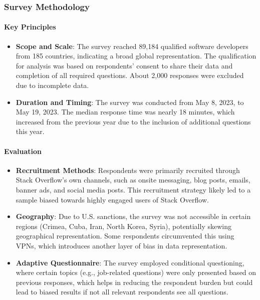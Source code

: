 \documentclass[
  12pt,
]{article}
\author{}
\date{\vspace{-2.5em}}
\begin{document}
\hypertarget{survey-methodology}{%
\subsubsection{Survey Methodology}\label{survey-methodology}}

\hypertarget{key-principles}{%
\paragraph{Key Principles}\label{key-principles}}

\begin{itemize}
\item
  \textbf{Scope and Scale}: The survey reached 89,184 qualified software
  developers from 185 countries, indicating a broad global
  representation. The qualification for analysis was based on
  respondents' consent to share their data and completion of all
  required questions. About 2,000 responses were excluded due to
  incomplete data.
\item
  \textbf{Duration and Timing}: The survey was conducted from May 8,
  2023, to May 19, 2023. The median response time was nearly 18 minutes,
  which increased from the previous year due to the inclusion of
  additional questions this year.
\end{itemize}

\hypertarget{evaluation}{%
\paragraph{Evaluation}\label{evaluation}}

\begin{itemize}
\item
  \textbf{Recruitment Methods}: Respondents were primarily recruited
  through Stack Overflow's own channels, such as onsite messaging, blog
  posts, emails, banner ads, and social media posts. This recruitment
  strategy likely led to a sample biased towards highly engaged users of
  Stack Overflow.
\item
  \textbf{Geography}: Due to U.S. sanctions, the survey was not
  accessible in certain regions (Crimea, Cuba, Iran, North Korea,
  Syria), potentially skewing geographical representation. Some
  respondents circumvented this using VPNs, which introduces another
  layer of bias in data representation.
\item
  \textbf{Adaptive Questionnaire}: The survey employed conditional
  questioning, where certain topics (e.g., job-related questions) were
  only presented based on previous responses, which helps in reducing
  the respondent burden but could lead to biased results if not all
  relevant respondents see all questions.
\end{itemize}
\end{document}
